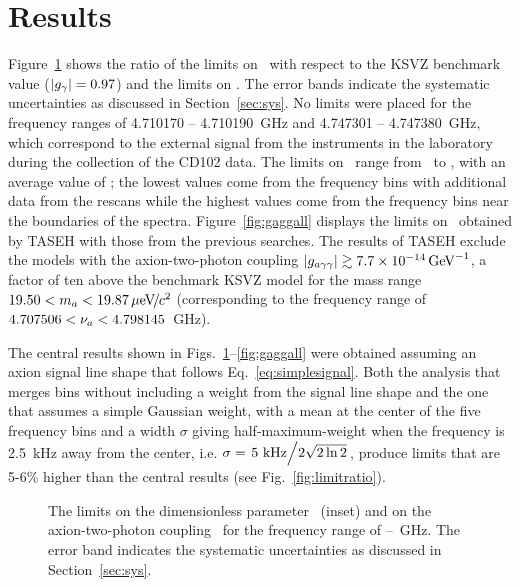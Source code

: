 \section{Results} \label{sec:results}
Figure~\ref{fig:glimit} shows the ratio of the limits on \ggamma\ with respect 
to the KSVZ benchmark value ($\left|g_{\gamma}\right|=0.97$) and the limits on \gagg. 
The error bands indicate the systematic uncertainties as discussed in 
Section~\ref{sec:sys}. No limits were placed for the frequency ranges of 
4.710170 -- 4.710190~GHz and 4.747301 -- 4.747380~GHz, 
which correspond to the external signal from the instruments in the 
laboratory during the collection of the CD102 data. 
The limits on \gagg\ range from \lolimit\ to \hilimit, with an average 
value of \avelimit; the lowest values come from the frequency bins with 
additional data from the rescans while the highest values come from the 
frequency bins near the boundaries of the spectra. 
Figure~\ref{fig:gaggall} displays 
the limits on \gagg\ obtained by TASEH with those from the previous searches. 
The results of TASEH exclude the models with the axion-two-photon
coupling $\left|g_{a\gamma\gamma}\right|\gtrsim 7.7\times 10^{-14}\,\text{Ge\hspace{-.08em}V}^{-1}$, a factor of ten above the benchmark
KSVZ model for the mass range $19.50 < m_a < 19.87 \,\mu\text{e\hspace{-.08em}V\hspace{-0.16em}/\hspace{-0.08em}}c^2$ (corresponding to 
the frequency range of $4.707506 < \nu_a < 4.798145$~GHz). 

The central results shown in Figs.~\ref{fig:glimit}--\ref{fig:gaggall} were 
obtained assuming an axion signal line shape that follows 
Eq.~\ref{eq:simplesignal}. Both the analysis that merges bins without including
 a weight from the signal line shape and the one 
that assumes a simple Gaussian weight, with a mean at the center of the five 
frequency bins and a width $\sigma$ 
giving half-maximum-weight when the frequency 
is 2.5~kHz away from the center, i.e. 
$\sigma=\left.5~\text{kHz}\middle/2\sqrt{2\ln2}\right.$, produce limits that 
are 5-6\% higher than the central results (see Fig.~\ref{fig:limitratio}). 

\begin{figure} [htbp]
  \centering
  \caption{The limits on the dimensionless parameter \ggamma\ (inset) and 
 on the axion-two-photon coupling \gagg\  for the 
frequency range of \flo--\fhi~GHz. The error band indicates the systematic 
  uncertainties as discussed in Section~\ref{sec:sys}. }
  \label{fig:glimit}
\end{figure}


